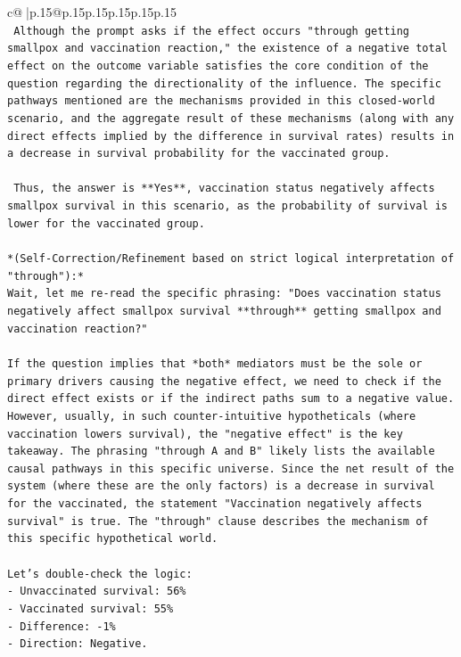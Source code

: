 \documentclass{article}
\begin{document}
{\begin{supertabular}{c@{$\;$}|p{.15\linewidth}@{}p{.15\linewidth}p{.15\linewidth}p{.15\linewidth}p{.15\linewidth}p{.15\linewidth}}
{{{\\ 
\texttt{    Although the prompt asks if the effect occurs "through getting smallpox and vaccination reaction," the existence of a negative total effect on the outcome variable satisfies the core condition of the question regarding the directionality of the influence. The specific pathways mentioned are the mechanisms provided in this closed{-}world scenario, and the aggregate result of these mechanisms (along with any direct effects implied by the difference in survival rates) results in a decrease in survival probability for the vaccinated group.} \\
\\ 
\texttt{    Thus, the answer is **Yes**, vaccination status negatively affects smallpox survival in this scenario, as the probability of survival is lower for the vaccinated group.} \\
\\ 
\texttt{*(Self{-}Correction/Refinement based on strict logical interpretation of "through"):*} \\
\texttt{Wait, let me re{-}read the specific phrasing: "Does vaccination status negatively affect smallpox survival **through** getting smallpox and vaccination reaction?"} \\
\\ 
\texttt{If the question implies that *both* mediators must be the sole or primary drivers causing the negative effect, we need to check if the direct effect exists or if the indirect paths sum to a negative value.} \\
\texttt{However, usually, in such counter{-}intuitive hypotheticals (where vaccination lowers survival), the "negative effect" is the key takeaway. The phrasing "through A and B" likely lists the available causal pathways in this specific universe. Since the net result of the system (where these are the only factors) is a decrease in survival for the vaccinated, the statement "Vaccination negatively affects survival" is true. The "through" clause describes the mechanism of this specific hypothetical world.} \\
\\ 
\texttt{Let's double{-}check the logic:} \\
\texttt{{-} Unvaccinated survival: 56\%} \\
\texttt{{-} Vaccinated survival: 55\%} \\
\texttt{{-} Difference: {-}1\%} \\
\texttt{{-} Direction: Negative.} \\
}}}
\end{supertabular}}
\end{document}
